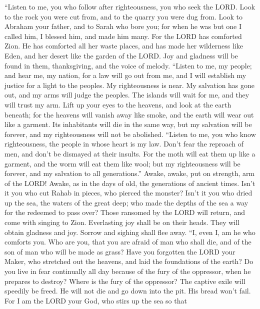  ``Listen to me, you who follow after righteousness, you
who seek the LORD. Look to the rock you were cut from, and to the quarry
you were dug from.  Look to Abraham your father, and to
Sarah who bore you; for when he was but one I called him, I blessed him,
and made him many.  For the LORD has comforted Zion. He
has comforted all her waste places, and has made her wilderness like
Eden, and her desert like the garden of the LORD. Joy and gladness will
be found in them, thanksgiving, and the voice of melody. 
``Listen to me, my people; and hear me, my nation, for a law will go out
from me, and I will establish my justice for a light to the peoples.
 My righteousness is near. My salvation has gone out, and
my arms will judge the peoples. The islands will wait for me, and they
will trust my arm.  Lift up your eyes to the heavens, and
look at the earth beneath; for the heavens will vanish away like smoke,
and the earth will wear out like a garment. Its inhabitants will die in
the same way, but my salvation will be forever, and my righteousness
will not be abolished.  ``Listen to me, you who know
righteousness, the people in whose heart is my law. Don't fear the
reproach of men, and don't be dismayed at their insults. 
For the moth will eat them up like a garment, and the worm will eat them
like wool; but my righteousness will be forever, and my salvation to all
generations.''  Awake, awake, put on strength, arm of the
LORD! Awake, as in the days of old, the generations of ancient times.
Isn't it you who cut Rahab in pieces, who pierced the monster?
 Isn't it you who dried up the sea, the waters of the
great deep; who made the depths of the sea a way for the redeemed to
pass over?  Those ransomed by the LORD will return, and
come with singing to Zion. Everlasting joy shall be on their heads. They
will obtain gladness and joy. Sorrow and sighing shall flee away.
 ``I, even I, am he who comforts you. Who are you, that
you are afraid of man who shall die, and of the son of man who will be
made as grass?  Have you forgotten the LORD your Maker,
who stretched out the heavens, and laid the foundations of the earth? Do
you live in fear continually all day because of the fury of the
oppressor, when he prepares to destroy? Where is the fury of the
oppressor?  The captive exile will speedily be freed. He
will not die and go down into the pit. His bread won't fail.
 For I am the LORD your God, who stirs up the sea so that

